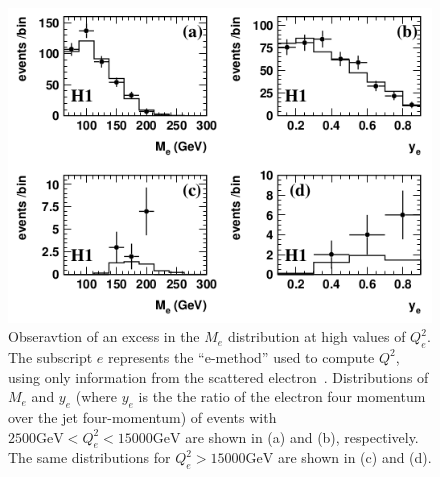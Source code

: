 \begin{figure}[!Hh]
       \centering
       \includegraphics[scale=0.85]{Figures/H1Excess_M.png} 
       \caption[Excesses measured by the H1 collaboration in the mass and $y$ distributions of neutral current deep inelastic scattering events]{Obseravtion of an excess in the $M_e$ distribution at high values of $Q_e^2$.  The subscript $e$ represents the ``e-method'' used to compute $Q^2$, using only information from the scattered electron~\cite{H1excess}.  Distributions of $M_e$ and $y_e$ (where $y_e$ is the the ratio of the electron four momentum over the jet four-momentum) of events with $2500 \text{GeV} < Q_e^2 < 15000 \text{GeV}$ are shown in (a) and (b), respectively.  The same distributions for $Q_e^2 > 15000 \text{GeV}$ are shown in (c) and (d).}
\label{figapp:Q2excess}
\end{figure}




